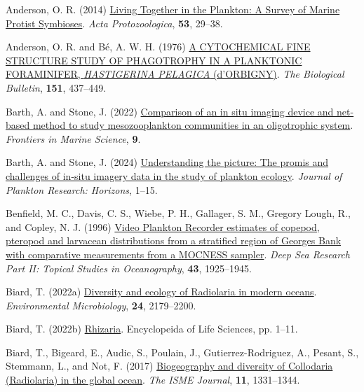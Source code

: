 \documentclass[
]{article}
\newlength{\cslhangindent}
\newenvironment{CSLReferences}[2] %
 {\begin{list}{}{%
  \setlength{\itemindent}{0pt}
  \setlength{\leftmargin}{0pt}
  \setlength{\parsep}{0pt}
  \ifodd #1
   \setlength{\leftmargin}{\cslhangindent}
   \setlength{\itemindent}{-1\cslhangindent}
  \fi
  \setlength{\itemsep}{#2\baselineskip}}}
 {\end{list}}
\begin{document}
\label{refs}
\begin{CSLReferences}{1}{0}
Anderson, O. R. (2014)
\href{https://doi.org/10.4467/16890027AP.13.0019.1116}{Living Together
in the Plankton: A Survey of Marine Protist Symbioses}. \emph{Acta
Protozoologica}, \textbf{53}, 29--38.

Anderson, O. R. and Bé, A. W. H. (1976)
\href{https://doi.org/10.2307/1540498}{A CYTOCHEMICAL FINE STRUCTURE
STUDY OF PHAGOTROPHY IN A PLANKTONIC FORAMINIFER, {\emph{HASTIGERINA
PELAGICA}} (d'ORBIGNY)}. \emph{The Biological Bulletin}, \textbf{151},
437--449.

Barth, A. and Stone, J. (2022)
\href{https://www.frontiersin.org/articles/10.3389/fmars.2022.898057}{Comparison
of an in situ imaging device and net-based method to study
mesozooplankton communities in an oligotrophic system}. \emph{Frontiers
in Marine Science}, \textbf{9}.

Barth, A. and Stone, J. (2024)
\href{https://doi.org/10.1093/plankt/fbae023}{Understanding the picture:
The promis and challenges of in-situ imagery data in the study of
plankton ecology}. \emph{Journal of Plankton Research: Horizons}, 1--15.

Benfield, M. C., Davis, C. S., Wiebe, P. H., Gallager, S. M., Gregory
Lough, R., and Copley, N. J. (1996)
\href{https://doi.org/10.1016/S0967-0645(96)00044-6}{Video Plankton
Recorder estimates of copepod, pteropod and larvacean distributions from
a stratified region of Georges Bank with comparative measurements from a
MOCNESS sampler}. \emph{Deep Sea Research Part II: Topical Studies in
Oceanography}, \textbf{43}, 1925--1945.

Biard, T. (2022a)
\href{https://doi.org/10.1111/1462-2920.16004}{Diversity and ecology of
Radiolaria in modern oceans}. \emph{Environmental Microbiology},
\textbf{24}, 2179--2200.

Biard, T. (2022b)
\href{https://doi.org/10.1002/9780470015902.a0029469}{Rhizaria}.
Encyclopeida of Life Sciences, pp. 1--11.

Biard, T., Bigeard, E., Audic, S., Poulain, J., Gutierrez-Rodriguez, A.,
Pesant, S., Stemmann, L., and Not, F. (2017)
\href{https://doi.org/10.1038/ismej.2017.12}{Biogeography and diversity
of Collodaria (Radiolaria) in the global ocean}. \emph{The ISME
Journal}, \textbf{11}, 1331--1344.


\end{CSLReferences}
\end{document}
